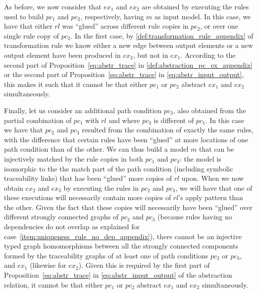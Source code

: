 \begin{pf}
As before, we now consider that $ex_1$ and $ex_2$ are obtained by executing the rules used to build $pc_1$ and $pc_2$, respectively, having $m$ as input model. In this case, we have that either $rl$ was ``glued'' across different rule copies in $pc_2$, or over one single rule copy of $pc_2$. In the first case, by \cref{def:transformation_rule_appendix} of transformation rule we know either a new edge between output elements or a new output element have been produced in $ex_2$, but not in $ex_1$. According to the second part of Proposition~\ref{eq:abstr_trace} in \cref{def:abstraction_pc_ex_appendix} or the second part of Proposition~\ref{eq:abstr_trace} in \cref{eq:abstr_input_output}, this makes it such that it cannot be that either $pc_1$ or $pc_2$ abstract $ex_1$ and $ex_2$ simultaneously.\vspace{.3cm}

Finally, let us consider an additional path condition $pc_3$, also obtained from the partial combination of $pc_1$ with $rl$ and where $pc_3$ is different of $pc_1$. In this case we have that $pc_2$ and $pc_3$ resulted from the combination of exactly the same rules, with the difference that certain rules have been ``glued'' at more locations of one path condition than of the other. We can thus build a model $m$ that can be injectively matched by the rule copies in both $pc_1$ and $pc_2$: the model is isomorphic to the the match part of the path condition (including symbolic traceability links) that has been ``glued'' more copies of $rl$ upon. When we now obtain $ex_2$ and $ex_3$ by executing the rules in $pc_2$ and $pc_3$, we will have that one of these executions will necessarily contain more copies of $rl$'s apply pattern than the other. Given the fact that these copies will necessarily have been ``glued'' over different strongly connected graphs of $pc_2$ and $pc_3$ (because rules having no dependencies do not overlap as explained for case~\ref{item:uniqueness_rule_no_dep_appendix}), there cannot be an injective typed graph homomorphisms between all the strongly connected components formed by the traceability graphs of at least one of path conditions $pc_2$ or $pc_3$, and $ex_1$ (likewise for $ex_2$). Given this is required by the first part of Proposition~\ref{eq:abstr_trace} in \cref{eq:abstr_input_output} of the abstraction relation, it cannot be that either $pc_1$ or $pc_2$ abstract $ex_1$ and $ex_2$ simultaneously.



\end{pf}


\clearpage
